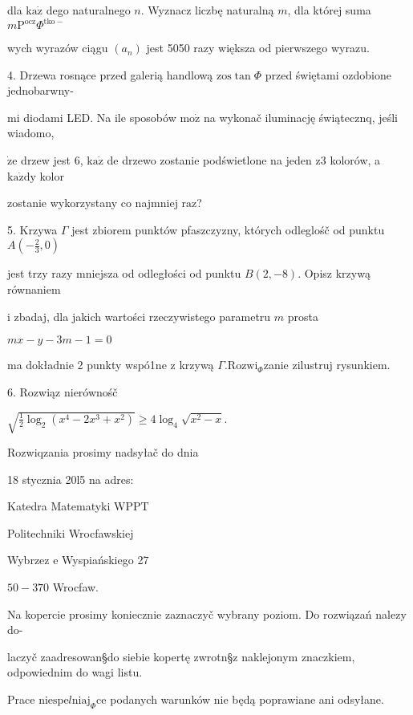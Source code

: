 \documentclass[a4paper,12pt]{article}
\begin{document}
dla $\mathrm{k}\mathrm{a}\dot{\mathrm{z}}$ dego naturalnego $n$. Wyznacz liczbę naturalną $m$, dla której suma $m\mathrm{P}^{\mathrm{o}\mathrm{c}\mathrm{z}}\Phi^{\mathrm{t}\mathrm{k}\mathrm{o}-}$

wych wyrazów ciągu $(a_{n})$ jest 5050 razy większa od pierwszego wyrazu.

4. Drzewa rosnące przed galerią handlową $\mathrm{z}\mathrm{o}\mathrm{s}\tan\Phi$ przed świętami ozdobione jednobarwny-

mi diodami LED. Na ile sposobów $\mathrm{m}\mathrm{o}\dot{\mathrm{z}}$ na wykonač iluminację świątecznq, jeśli wiadomo,

$\dot{\mathrm{z}}\mathrm{e}$ drzew jest 6, $\mathrm{k}\mathrm{a}\dot{\mathrm{z}}$ de drzewo zostanie podświetlone na jeden $\mathrm{z}3$ kolorów, a $\mathrm{k}\mathrm{a}\dot{\mathrm{z}}\mathrm{d}\mathrm{y}$ kolor

zostanie wykorzystany co najmniej $\mathrm{r}\mathrm{a}\mathrm{z}$?

5. Krzywa $\Gamma$ jest zbiorem punktów pfaszczyzny, których odleglośč od punktu $A(-\displaystyle \frac{2}{3},0)$

jest trzy razy mniejsza od odległości od punktu $B(2,-8)$. Opisz krzywą równaniem

$\mathrm{i}$ zbadaj, dla jakich wartości rzeczywistego parametru $m$ prosta

$mx-y-3m-1=0$

ma dokładnie 2 punkty wspó1ne $\mathrm{z}$ krzywą $\Gamma. \mathrm{R}\mathrm{o}\mathrm{z}\mathrm{w}\mathrm{i}_{\Phi}$zanie zilustruj rysunkiem.

6. Rozwiąz nierównośč

$\sqrt{\frac{1}{2}\log_{2}(x^{4}-2x^{3}+x^{2})}\geq 4\log_{4}\sqrt{x^{2}-x}.$

Rozwiqzania prosimy nadsyłač do dnia

18 stycznia 20l5 na adres:

Katedra Matematyki WPPT

Politechniki Wrocfawskiej

Wybrzez $\mathrm{e}$ Wyspiańskiego 27

$50-370$ Wrocfaw.

Na kopercie prosimy koniecznie zaznaczyč wybrany poziom. Do rozwiązań nalez$\mathrm{y}$ do-

laczyč zaadresowan\S do siebie kopertę zwrotn\S z naklejonym znaczkiem, odpowiednim do wagi listu.

Prace $\mathrm{n}\mathrm{i}\mathrm{e}\mathrm{s}\mathrm{p}\mathrm{e}l\mathrm{n}\mathrm{i}\mathrm{a}\mathrm{j}_{\Phi}\mathrm{c}\mathrm{e}$ podanych warunków nie będą poprawiane ani odsyłane.
\end{document}
